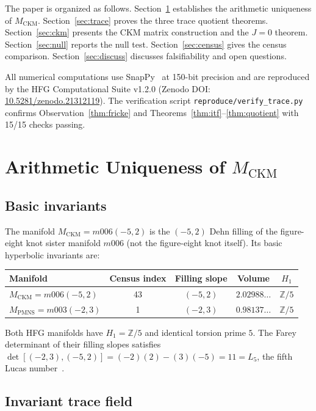 \documentclass[11pt,a4paper]{article}
\theoremstyle{remark}
\newcommand{\MCKM}{M_{\mathrm{CKM}}}
\newcommand{\MPMNS}{M_{\mathrm{PMNS}}}
\newcommand{\Zfive}{\mathbb{Z}/5}
\begin{document}
The paper is organized as follows.
Section~\ref{sec:manifold} establishes the arithmetic uniqueness of
$\MCKM$.
Section~\ref{sec:trace} proves the three trace quotient theorems.
Section~\ref{sec:ckm} presents the CKM matrix construction and the
$J=0$ theorem.
Section~\ref{sec:null} reports the null test.
Section~\ref{sec:census} gives the census comparison.
Section~\ref{sec:discuss} discusses falsifiability and open questions.

All numerical computations use SnapPy~\cite{SnapPy} at 150-bit precision
and are reproduced by the HFG Computational Suite v1.2.0
(Zenodo DOI: \href{https://doi.org/10.5281/zenodo.21312119}{10.5281/zenodo.21312119}).
The verification script \texttt{reproduce/verify\_trace.py} confirms
Observation~\ref{thm:fricke} and Theorems~\ref{thm:itf}--\ref{thm:quotient}
with 15/15 checks passing.

\section{Arithmetic Uniqueness of $\MCKM$}
\label{sec:manifold}

\subsection{Basic invariants}

The manifold $\MCKM = m006(-5,2)$ is the $(-5,2)$ Dehn filling of
the figure-eight knot sister manifold $m006$ (not the figure-eight
knot itself).
Its basic hyperbolic invariants are:

\begin{center}
\begin{tabular}{lcccc}
\toprule
Manifold & Census index & Filling slope & Volume & $H_1$ \\
\midrule
$\MCKM = m006(-5,2)$ & 43 & $(-5,2)$ & $2.02988\ldots$ & $\Zfive$ \\
$\MPMNS = m003(-2,3)$ & 1  & $(-2,3)$ & $0.98137\ldots$ & $\Zfive$ \\
\bottomrule
\end{tabular}
\end{center}

Both HFG manifolds have $H_1 = \Zfive$ and identical torsion prime $5$.
The Farey determinant of their filling slopes satisfies
$\det[(-2,3),(-5,2)] = (-2)(2) - (3)(-5) = 11 = L_5$,
the fifth Lucas number~\cite{Gentry:Farey}.

\subsection{Invariant trace field}
\end{document}
